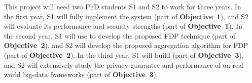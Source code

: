 This project will need two PhD students S1 and S2 to work for 
three years. In the first year, S1 will fully implement the \kakute 
system (part of \textbf{Objective~1}), and S2 will evaluate its performance 
and security strengths (part of \textbf{Objective~1}). In the second year, S1 
will 
use \kakute to develop the proposed FDP technique (part of 
\textbf{Objective~2}), and S2 will develop the proposed aggregation algorithm 
for FDP (part of \textbf{Objective~2}). In the third year, S1 will build \maat 
(part of \textbf{Objective~3}), and S2 will extensively study the privacy 
guarantee and performance of \maat on real-world big-data 
frameworks (part of \textbf{Objective~3}).


